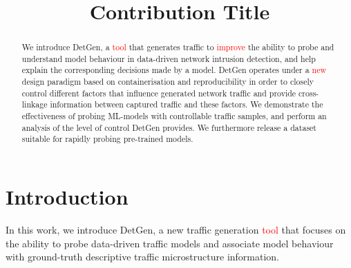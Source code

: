 \documentclass[runningheads]{llncs}
\begin{document}
\title{Contribution Title}
%
%
%
%
%
\maketitle 

\begin{abstract}

We introduce DetGen, a \textcolor{red}{tool} that generates traffic to \textcolor{red}{improve} the ability to probe and understand model behaviour in data-driven network intrusion detection, and help explain the corresponding decisions made by a model. 
DetGen operates under a \textcolor{red}{new} design paradigm based on containerisation and reproducibility in order to closely control different factors that influence generated network traffic and provide cross-linkage information between captured traffic and these factors.
We demonstrate the effectiveness of probing ML-models with controllable traffic samples, and perform an analysis of the level of control DetGen provides. We furthermore release a dataset suitable for rapidly probing pre-trained models. 
\end{abstract}





\section{Introduction}

In this work, we introduce DetGen, a new traffic generation \textcolor{red}{tool} that focuses on the ability to probe data-driven traffic models and associate model behaviour with ground-truth descriptive traffic microstructure information.
\end{document}
